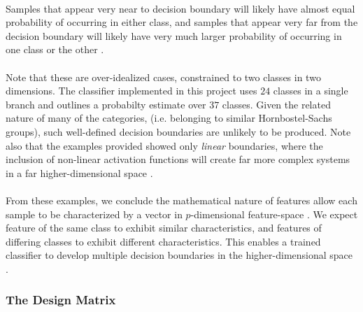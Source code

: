 \documentclass[12pt,letterpaper]{article}
\begin{document}
\paragraph*{}Samples that appear very near to decision boundary will likely have almost equal probability of occurring in either class, and samples that appear very far from the decision boundary will likely have very much larger probability of occurring in one class or the other \cite{Bishop,James}. 

\paragraph*{}Note that these are over-idealized cases, constrained to two classes in two dimensions. The classifier implemented in this project uses $24$ classes in a single branch and outlines a probabilty estimate over $37$ classes. Given the related nature of many of the categories, (i.e. belonging to similar Hornbostel-Sachs groups), such well-defined decision boundaries are unlikely to be produced. Note also that the examples provided showed only \textit{linear} boundaries, where the inclusion of non-linear activation functions will create far more complex systems in a far higher-dimensional space \cite{Goodfellow}.

\paragraph*{}From these examples, we conclude the mathematical nature of features allow each sample to be characterized by a vector in $p$-dimensional feature-space \cite{Goodfellow,James}. We expect feature of the same class to exhibit similar characteristics, and features of differing classes to exhibit different characteristics. This enables a trained classifier to develop multiple decision boundaries in the higher-dimensional space \cite{James,Bishop}.


\subsubsection{The Design Matrix}
\label{subsubsec-DesignMatrix}
\end{document}
